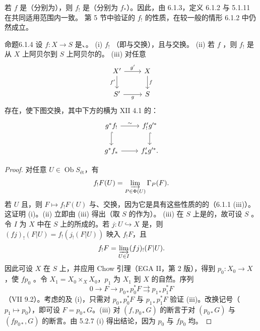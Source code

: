 若 $f$ 是（分别为），则 $f_!$ 是（分别为 $f_*$）。因此，由 6.1.3，定义 6.1.2 与 5.1.11 在共同适用范围内一致。
第 5 节中验证的 $f_!$ 的性质，在较一般的情形 6.1.2 中仍然成立。
\begin{SGAresult}{命题}{6.1.4}
设 $f:X\to S$ 是、。
(i) $f_!$ （即与交换），且与交换。
(ii) 若 $f$ ，则 $f_!$ 是从 $X$ 上阿贝尔到 $S$ 上阿贝尔的。
(iii) 对任意
\[\begin{tikzcd}X'\arrow[r,"g'"]\arrow[d,"f'"']&X\arrow[d,"f"]\\S'\arrow[r,"g"']&S\end{tikzcd}\]
存在，使下图交换，其中下方的横为 XII 4.1 的：
\[\begin{tikzcd}g^*f_!\arrow[r,"\sim"]\arrow[d,hook]&f'_!g'^*\arrow[d,hook]\\g^*f_*\arrow[r]&f'_*g'^*.\end{tikzcd}\]
\end{SGAresult}
\begin{proof}
对任意 $U\in\operatorname{Ob}S_{\text{ét}}$，有
\[f_!F(U)=\varinjlim_{P\in\Phi(U)}\Gamma_P(F).\]
若 $U$ 且，则 $F\mapsto f_!F(U)$ 与、交换，因为它是具有这些性质的的（6.1.1 (iii)）。这证明 (i)。(ii) 立即由 (iii) 得出（取 $S$ 的作为）。
(iii) 在 $S$ 上是的，故可设 $S$ 。令 $I$ 为 $X$ 中在 $S$ 上的所成的。若 $j:U\hookrightarrow X$ 是，则 $(fj)_!(F|U)=f_!(j_!(F|U))$ 映入 $f_!F$，且
\[f_!F=\varinjlim_{U\in I}(fj)_!(F|U).\]
因此可设 $X$ 在 $S$ 上，并应用 Chow 引理（EGA II，第 2 版），得到 $p_0:X_0\to X$，使 $fp_0$ 。令 $X_1=X_0\times_X X_0$，$p_1$ 为 $X_1$ 到 $X$ 的自然。序列
\[0\longrightarrow F\longrightarrow p_{0*}p_0^*F\rightrightarrows p_{1*}p_1^*F\]
（VII 9.2）。考虑的及 (i)，只需对 $p_{0*}p_0^*F$ 与 $p_{1*}p_1^*F$ 验证 (iii)。改换记号（$p_1\mapsto p_0$），即可设 $F=p_{0*}G$。(iii) 对 $(f,p_{0*}G)$ 的断言于对 $(p_{0*}G)$ 与 $(fp_{0*},G)$ 的断言。由 5.2.7 (i) 得出结论，因为 $p_0$ 与 $fp_0$ 均。
\end{proof}
